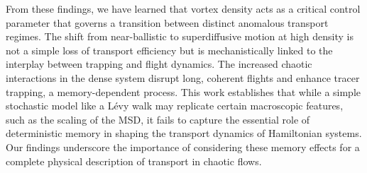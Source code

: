 \documentclass[]{article}
\begin{document}
From these findings, we have learned that vortex density acts as a critical control parameter that governs a transition between distinct anomalous transport regimes. The shift from near-ballistic to superdiffusive motion at high density is not a simple loss of transport efficiency but is mechanistically linked to the interplay between trapping and flight dynamics. The increased chaotic interactions in the dense system disrupt long, coherent flights and enhance tracer trapping, a memory-dependent process. This work establishes that while a simple stochastic model like a L\'evy walk may replicate certain macroscopic features, such as the scaling of the MSD, it fails to capture the essential role of deterministic memory in shaping the transport dynamics of Hamiltonian systems. Our findings underscore the importance of considering these memory effects for a complete physical description of transport in chaotic flows.


{}

\end{document}
